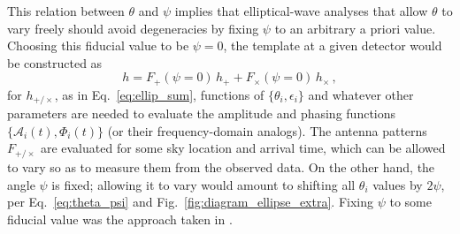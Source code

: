 \documentclass[aps,prd,twocolumn,superscriptaddress,preprintnumbers,floatfix,nofootinbib]{revtex4-2}
\begin{document}
This relation between $\theta$ and $\psi$ implies that elliptical-wave analyses that allow $\theta$ to vary freely should avoid degeneracies by fixing $\psi$ to an arbitrary a priori value.
Choosing this fiducial value to be $\psi=0$, the template at a given detector would be constructed as
\begin{equation}
h = F_+(\psi=0)\, h_+ + F_\times(\psi=0)\,  h_\times \, ,
\end{equation}
for $h_{+/\times}$, as in Eq.~\eqref{eq:ellip_sum}, functions of $\{\theta_i, \epsilon_i\}$ and whatever other parameters are needed to evaluate the amplitude and phasing functions $\{\mathcal{A}_i(t), \Phi_i(t)\}$ (or their frequency-domain analogs).
The antenna patterns $F_{+/\times}$ are evaluated for some sky location and arrival time, which can be allowed to vary so as to measure them from the observed data.
On the other hand, the angle $\psi$ is fixed; allowing it to vary would amount to shifting all $\theta_i$ values by $2\psi$, per Eq.~\eqref{eq:theta_psi} and Fig.~\ref{fig:diagram_ellipse_extra}.
Fixing $\psi$ to some fiducial value was the approach taken in \cite{Isi:2017equ,Chatziioannou:2021mij,Isi:2021iql}.


\end{document}
